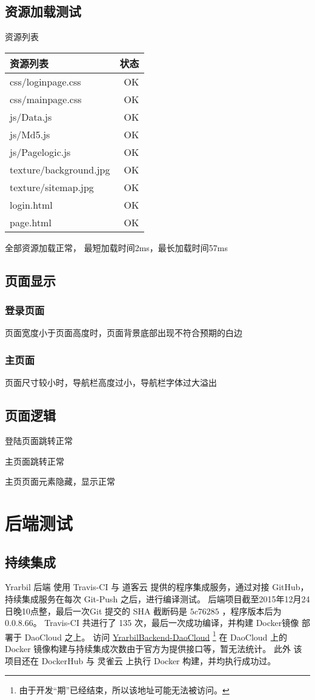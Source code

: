 \documentclass[UTF8]{report}
\begin{document}
    \section{资源加载测试}
    资源列表
    \begin{tabular}{|l|r|}
        \hline 资源列表 & 状态  \\ \hline
    css/loginpage.css  & OK \\ \hline
    css/mainpage.css &  OK \\ \hline
    js/Data.js   &OK \\ \hline
    js/Md5.js   &OK \\ \hline
    js/Pagelogic.js &  OK \\ \hline
    texture/background.jpg&   OK \\ \hline
    texture/sitemap.jpg   &OK \\ \hline
    login.html  & OK \\ \hline
    page.html  & OK \\ \hline
    \end{tabular} 
    全部资源加载正常，
    最短加载时间2ms，最长加载时间57ms
    
    \section{页面显示}
    \subsection{登录页面}
    页面宽度小于页面高度时，页面背景底部出现不符合预期的白边
    \subsection{主页面}
    页面尺寸较小时，导航栏高度过小，导航栏字体过大溢出
    
    \section{页面逻辑}
    登陆页面跳转正常 \par
    主页面跳转正常 \par
    主页页面元素隐藏，显示正常
    \chapter{后端测试}
    \section{持续集成}
    Yrarbil 后端 使用 Travis-CI 与 道客云 提供的程序集成服务，通过对接 GitHub，持续集成服务在每次 Git-Push 之后，进行编译测试。
    后端项目截至2015年12月24日晚10点整，最后一次Git 提交的 SHA 截断码是 $5c76285$ ，程序版本后为 0.0.8.66。
    Travis-CI 共进行了 135 次，最后一次成功编译，并构建 Docker镜像 部署于 DaoCloud 之上。
    访问 \href{http://qinka-yrarbilbackend.daoapp.io}{YrarbilBackend-DaoCloud} 
    \footnote{由于开发“期”已经结束，所以该地址可能无法被访问。}
    在 DaoCloud 上的 Docker 镜像构建与持续集成次数由于官方为提供接口等，暂无法统计。
    此外 该项目还在 DockerHub 与 灵雀云 上执行 Docker 构建，并均执行成功过。
\end{document}
